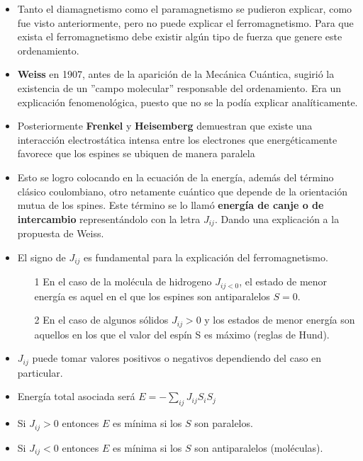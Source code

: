 \begin{itemize}
	\item Tanto el diamagnetismo como el paramagnetismo se pudieron explicar, como fue visto anteriormente, pero no puede explicar el ferromagnetismo. Para que exista el ferromagnetismo debe existir algún tipo de fuerza que genere este ordenamiento.
	
	\item \textbf{Weiss} en 1907, antes de la aparición de la Mecánica Cuántica, sugirió la existencia de un ''campo molecular” responsable del ordenamiento. Era un explicación fenomenológica, puesto que no se la podía explicar analíticamente.
	
	\item Posteriormente \textbf{Frenkel} y \textbf{Heisemberg} demuestran que existe una interacción electrostática intensa entre los electrones que energéticamente favorece que los espines se ubiquen de manera paralela

	\item Esto se logro colocando en la ecuación de la energía, además del término clásico coulombiano, otro netamente cuántico que depende de la orientación mutua de los spines. Este término se lo llamó \textbf{energía de canje o de intercambio} representándolo con la letra $J_{ij}$. Dando una explicación a la propuesta de Weiss.

	\item El signo de $J_{ij}$ es fundamental para la explicación del ferromagnetismo.
	\begin{itemize}
	\item[1] En el caso de la molécula de hidrogeno $J_{ij<0}$, el estado de menor energía es aquel en el que los espines son antiparalelos $S=0$. 
	
	\item[2] En el caso de algunos sólidos $J_{ij}>0$ y los estados de menor energía son aquellos en los que el valor del espín S es máximo (reglas de Hund). 
	\end{itemize}
	
	
	\item $J_{ij}$ puede tomar valores positivos o negativos dependiendo del caso en particular.
	
	\item Energía total asociada será $E=-\sum_{ij}J_{ij}S_{i}S_{j}$
	
	\item Si $J_{ij}>0$ entonces $E$ es mínima si los $S$ son paralelos.
	
	\item Si $J_{ij}<0$ entonces $E$ es mínima si los $S$ son antiparalelos (moléculas).
	

\end{itemize}
